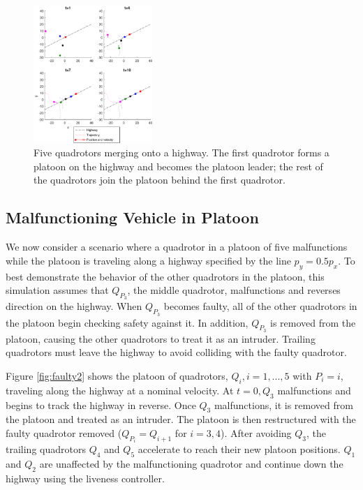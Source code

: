 \begin{figure}
	\centering
	\includegraphics[width=0.4\textwidth]{"normal5"}
	\caption{Five quadrotors merging onto a highway. The first quadrotor forms a platoon on the highway and becomes the platoon leader; the rest of the quadrotors join the platoon behind the first quadrotor.}
	\label{fig:normal5}
\end{figure}

\subsection{Malfunctioning Vehicle in Platoon}
We now consider a scenario where a quadrotor in a platoon of five malfunctions while the platoon is traveling along a highway specified by the line $p_y = 0.5p_x$. To best demonstrate the behavior of the other quadrotors in the platoon, this simulation assumes that $Q_{P_3}$, the middle quadrotor, malfunctions and reverses direction on the highway. When $Q_{P_3}$ becomes faulty, all of the other quadrotors in the platoon begin checking safety against it. In addition, $Q_{P_3}$ is removed from the platoon, causing the other quadrotors to treat it as an intruder.  Trailing quadrotors must leave the highway to avoid colliding with the faulty quadrotor. 

Figure \ref{fig:faulty2} shows the platoon of quadrotors, $Q_i,i = 1,...,5$ with $P_i = i$, traveling along the highway at a nominal velocity. At $t=0, Q_3$ malfunctions and begins to track the highway in reverse. Once $Q_3$ malfunctions, it is removed from the platoon and treated as an intruder. The platoon is then restructured with the faulty quadrotor removed ($Q_{P_i} = Q_{i+1}$ for $i=3,4$). After avoiding $Q_3$, the trailing quadrotors $Q_4$ and $Q_5$ accelerate to reach their new platoon positions. $Q_1$ and $Q_2$ are unaffected by the malfunctioning quadrotor and continue down the highway using the liveness controller. 

